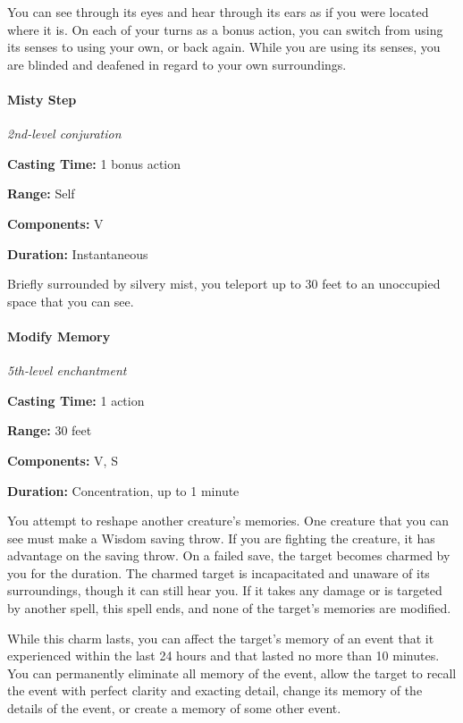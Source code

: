 \documentclass[
]{article}
\begin{document}
You can see through its eyes and hear through its ears as if you were
located where it is. On each of your turns as a bonus action, you can
switch from using its senses to using your own, or back again. While you
are using its senses, you are blinded and deafened in regard to your own
surroundings.

\hypertarget{misty-step}{%
\paragraph{Misty Step}\label{misty-step}}

\emph{2nd-level conjuration}

\textbf{Casting Time:} 1 bonus action

\textbf{Range:} Self

\textbf{Components:} V

\textbf{Duration:} Instantaneous

Briefly surrounded by silvery mist, you teleport up to 30 feet to an
unoccupied space that you can see.

\hypertarget{modify-memory}{%
\paragraph{Modify Memory}\label{modify-memory}}

\emph{5th-level enchantment}

\textbf{Casting Time:} 1 action

\textbf{Range:} 30 feet

\textbf{Components:} V, S

\textbf{Duration:} Concentration, up to 1 minute

You attempt to reshape another creature's memories. One creature that
you can see must make a Wisdom saving throw. If you are fighting the
creature, it has advantage on the saving throw. On a failed save, the
target becomes charmed by you for the duration. The charmed target is
incapacitated and unaware of its surroundings, though it can still hear
you. If it takes any damage or is targeted by another spell, this spell
ends, and none of the target's memories are modified.

While this charm lasts, you can affect the target's memory of an event
that it experienced within the last 24 hours and that lasted no more
than 10 minutes. You can permanently eliminate all memory of the event,
allow the target to recall the event with perfect clarity and exacting
detail, change its memory of the details of the event, or create a
memory of some other event.
\end{document}
